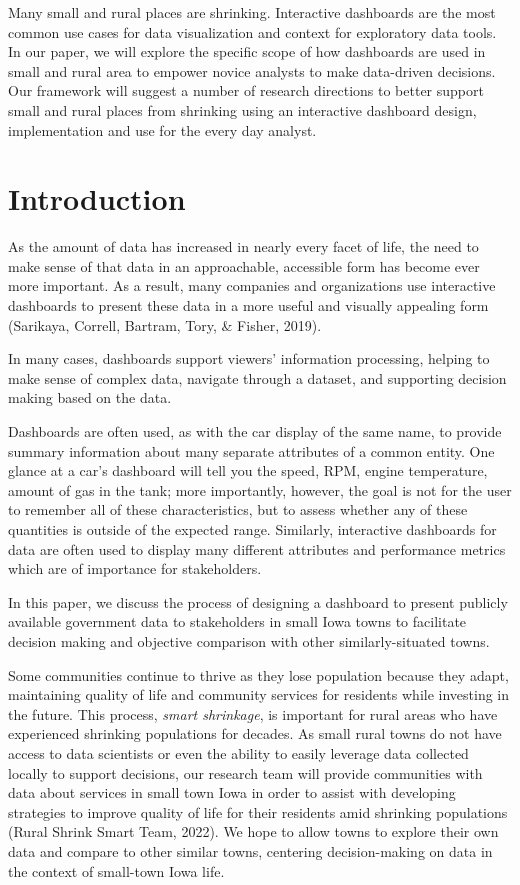 \documentclass[print]{nuthesis}
\begin{document}
Many small and rural places are shrinking. Interactive dashboards are the most common use cases for data visualization and context for exploratory data tools. In our paper, we will explore the specific scope of how dashboards are used in small and rural area to empower novice analysts to make data-driven decisions. Our framework will suggest a number of research directions to better support small and rural places from shrinking using an interactive dashboard design, implementation and use for the every day analyst.

\hypertarget{introduction-1}{%
\section{Introduction}\label{introduction-1}}

As the amount of data has increased in nearly every facet of life, the need to make sense of that data in an approachable, accessible form has become ever more important.
As a result, many companies and organizations use interactive dashboards to present these data in a more useful and visually appealing form (Sarikaya, Correll, Bartram, Tory, \& Fisher, 2019).

In many cases, dashboards support viewers' information processing, helping to make sense of complex data, navigate through a dataset, and supporting decision making based on the data.

Dashboards are often used, as with the car display of the same name, to provide summary information about many separate attributes of a common entity. One glance at a car's dashboard will tell you the speed, RPM, engine temperature, amount of gas in the tank; more importantly, however, the goal is not for the user to remember all of these characteristics, but to assess whether any of these quantities is outside of the expected range.
Similarly, interactive dashboards for data are often used to display many different attributes and performance metrics which are of importance for stakeholders.

In this paper, we discuss the process of designing a dashboard to present publicly available government data to stakeholders in small Iowa towns to facilitate decision making and objective comparison with other similarly-situated towns.

Some communities continue to thrive as they lose population because they adapt, maintaining quality of life and community services for residents while investing in the future. This process, \emph{smart shrinkage}, is important for rural areas who have experienced shrinking populations for decades. As small rural towns do not have access to data scientists or even the ability to easily leverage data collected locally to support decisions, our research team will provide communities with data about services in small town Iowa in order to assist with developing strategies to improve quality of life for their residents amid shrinking populations (Rural Shrink Smart Team, 2022). We hope to allow towns to explore their own data and compare to other similar towns, centering decision-making on data in the context of small-town Iowa life.
\end{document}
